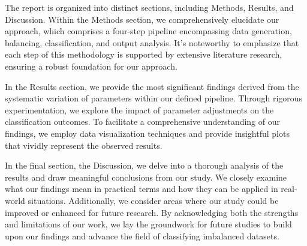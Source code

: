 The report is organized into distinct sections, including Methods, Results, and Discussion. Within the Methods section, we comprehensively elucidate our approach, which comprises a four-step pipeline encompassing data generation, balancing, classification, and output analysis. It's noteworthy to emphasize that each step of this methodology is supported by extensive literature research, ensuring a robust foundation for our approach.

In the Results section, we provide the most significant findings derived from the systematic variation of parameters within our defined pipeline. Through rigorous experimentation, we explore the impact of parameter adjustments on the classification outcomes. To facilitate a comprehensive understanding of our findings, we employ data visualization techniques and provide insightful plots that vividly represent the observed results. 

In the final section, the Discussion, we delve into a thorough analysis of the results and draw meaningful conclusions from our study. We closely examine what our findings mean in practical terms and how they can be applied in real-world situations. Additionally, we consider areas where our study could be improved or enhanced for future research. By acknowledging both the strengths and limitations of our work, we lay the groundwork for future studies to build upon our findings and advance the field of classifying imbalanced datasets.
